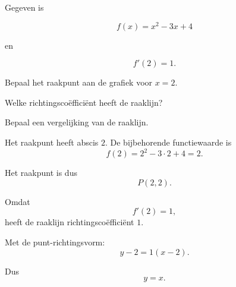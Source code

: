 \documentclass{ximera}
\begin{document}
\begin{oefening}{\oefB\ESS}

Gegeven is

\[
f(x)=x^2-3x+4
\]

en

\[
f'(2)=1.
\]

\begin{question}
Bepaal het raakpunt aan de grafiek voor $x=2$.
\end{question}

\begin{question}
Welke richtingscoëfficiënt heeft de raaklijn?
\end{question}

\begin{question}
Bepaal een vergelijking van de raaklijn.
\end{question}

\begin{oplossing}

Het raakpunt heeft abscis $2$. De bijbehorende functiewaarde is
\[
f(2)=2^2-3\cdot2+4=2.
\]

Het raakpunt is dus
\[
P(2,2).
\]

Omdat
\[
f'(2)=1,
\]
heeft de raaklijn richtingscoëfficiënt $1$.

Met de punt-richtingsvorm:
\[
y-2=1(x-2).
\]

Dus
\[
\boxed{y=x}.
\]

\end{oplossing}

\end{oefening}


\end{document}
